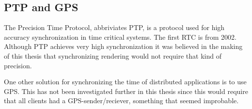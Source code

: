 \subsection{PTP and GPS}

The Precision Time Protocol, abbriviates PTP, is a protocol used for high accuracy synchronization in time critical systems. The first RTC is from 2002. Although PTP achieves very high synchronization it was believed in the making of this thesis that synchronizing rendering would not require that kind of precision. 

One other solution for synchronizing the time of distributed applications is to use GPS. This has not been investigated further in this thesis since this would require that all clients had a GPS-sender/reciever, something that seemed improbable. 
